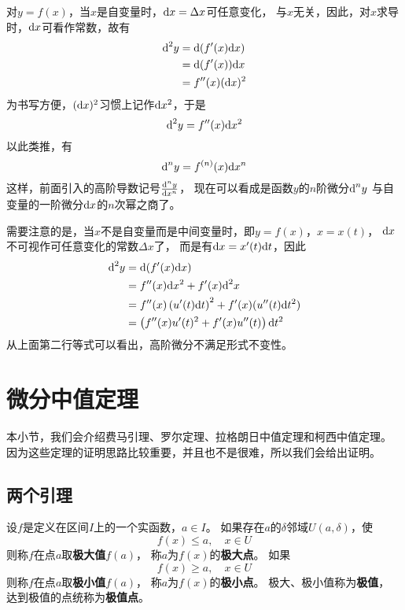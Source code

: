 对$y=f(x)$，当$x$是自变量时，$\textrm{d} x = \Delta x$可任意变化，
与$x$无关，因此，对$x$求导时，$\textrm{d} x$可看作常数，故有
\begin{align*}
  \textrm{d}^2 y
  &= \textrm{d}(f'(x)\textrm{d} x) \\
  &= \textrm{d}(f'(x))\textrm{d} x \\
  &= f''(x)(\textrm{d} x)^2
\end{align*}
为书写方便，$(\textrm{d} x)^2$习惯上记作$\textrm{d} x^2$，于是
\begin{displaymath}
  \textrm{d}^2 y = f''(x)\textrm{d} x^2
\end{displaymath}
以此类推，有
\begin{displaymath}
  \textrm{d}^n y = f^{(n)}(x) \textrm{d} x^n
\end{displaymath}
这样，前面引入的高阶导数记号$\frac{\textrm{d}^n y}{\textrm{d} x^n}$，
现在可以看成是函数$y$的$n$阶微分$\textrm{d}^n y$
与自变量的一阶微分$\textrm{d} x$的$n$次幂之商了。

需要注意的是，当$x$不是自变量而是中间变量时，即$y=f(x)$，$x=x(t)$，
$\textrm{d} x$不可视作可任意变化的常数$\Delta x$了，
而是有$\textrm{d} x = x'(t)\textrm{d} t$，因此
\begin{align*}
  \textrm{d}^2 y
  &= \textrm{d} (f'(x)\textrm{d} x) \\
  &= f''(x)\textrm{d} x^2 + f'(x)\textrm{d}^2 x \\
  &= f''(x)\left(u'(t)\textrm{d} t\right)^2 + f'(x)(u''(t)\textrm{d} t^2)\\
  &= \left(f''(x)u'(t)^2 + f'(x)u''(t)\right)\textrm{d} t^2
\end{align*}
从上面第二行等式可以看出，高阶微分不满足形式不变性。

\section{微分中值定理}
本小节，我们会介绍费马引理、罗尔定理、拉格朗日中值定理和柯西中值定理。
因为这些定理的证明思路比较重要，并且也不是很难，所以我们会给出证明。

\subsection{两个引理}
\begin{definition}[极值]
  设$f$是定义在区间$I$上的一个实函数，$a\in I$。
  如果存在$a$的$\delta$邻域$U(a,\delta)$，使
  \begin{displaymath}
    f(x) \le a,\quad x\in U
  \end{displaymath}
  则称$f$在点$a$取\textbf{极大值}$f(a)$，
  称$a$为$f(x)$的\textbf{极大点}。
  如果
  \begin{displaymath}
    f(x) \ge a,\quad x\in U
  \end{displaymath}
  则称$f$在点$a$取\textbf{极小值}$f(a)$，
  称$a$为$f(x)$的\textbf{极小点}。
  极大、极小值称为\textbf{极值}，
  达到极值的点统称为\textbf{极值点}。
\end{definition}


